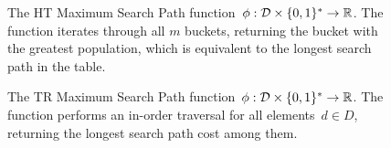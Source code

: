 \begin{figure}[h]
            \centering
            \begin{pchstack}[boxed,center,space=0.5em]
            \end{pchstack}
      \caption[HT Maximum Search Path.]{The HT Maximum Search Path function~$\phi : \mathcal{D} \times \{0,1 \}^{*} \rightarrow  \mathbb{R}$. The function iterates through all $m$ buckets, returning the bucket with the greatest population, which is equivalent to the longest search path in the table.
      } 
      \label{fig:ht-pop}
\end{figure}

    \begin{figure}[h]
            \centering
            \begin{pcvstack}[boxed,center,space=0.5em]
            \end{pcvstack}
      \caption[Treap Maximum Search Path.]{The TR Maximum Search Path function~$\phi : \mathcal{D} \times \{0,1 \}^{*} \rightarrow  \mathbb{R}$. The function performs an in-order traversal for all elements~$d \in D$, returning the longest search path cost among them.
      } 
      \label{fig:t-cost}
\end{figure}
    
